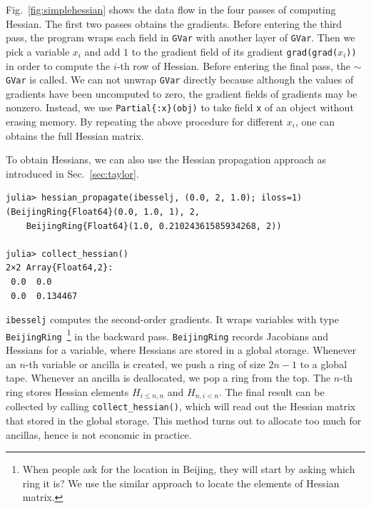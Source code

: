 \documentclass[aps,twocolumn,longbibliography,english,superscriptaddress]{revtex4-1}
\newcommand{\<}{\langle}
\renewcommand{\>}{\rangle}
\newcommand{\Fig}[1]{Fig.~\ref{#1}}
\newcommand{\Sec}[1]{Sec.~\ref{#1}}
\theoremstyle{definition}\newtheorem{definition}{\textit{Definition}}
\begin{document}
\Fig{fig:simplehessian} shows the data flow in the four passes of computing Hessian. The first two passes obtains the gradients. Before entering the third pass, the program wraps each field in \texttt{GVar} with another layer of \texttt{GVar}. Then we pick a variable $x_i$ and add $1$ to the gradient field of its gradient \texttt{grad(grad($x_i$))} in order to compute the $i$-th row of Hessian. Before entering the final pass, the \texttt{$\sim$GVar} is called. We can not unwrap \texttt{GVar} directly because although the values of gradients have been uncomputed to zero, the gradient fields of gradients may be nonzero. Instead, we use \texttt{Partial\{:x\}(obj)} to take field \texttt{x} of an object without erasing memory. By repeating the above procedure for different $x_i$, one can obtains the full Hessian matrix.

To obtain Hessians, we can also use the Hessian propagation approach as introduced in \Sec{sec:taylor}.

\begin{minipage}{.44\textwidth}
\begin{lstlisting}
julia> hessian_propagate(ibesselj, (0.0, 2, 1.0); iloss=1)
(BeijingRing{Float64}(0.0, 1.0, 1), 2,
    BeijingRing{Float64}(1.0, 0.21024361585934268, 2))

julia> collect_hessian()
2×2 Array{Float64,2}:
 0.0  0.0     
 0.0  0.134467
\end{lstlisting}
\end{minipage}

\texttt{ibesselj\textquotesingle\textquotesingle} computes the second-order gradients. It wraps variables with type \texttt{BeijingRing}~\footnote{When people ask for the location in Beijing, they will start by asking which ring it is? We use the similar approach to locate the elements of Hessian matrix.} in the backward pass. \texttt{BeijingRing} records Jacobians and Hessians for a variable, where Hessians are stored in a global storage.
Whenever an $n$-th variable or ancilla is created, we push a ring of size $2n-1$ to a global tape. Whenever an ancilla is deallocated, we pop a ring from the top. The $n$-th ring stores Hessian elements $H_{i\leq n,n}$ and $H_{n,i<n}$.%
The final result can be collected by calling \texttt{collect\_hessian()}, which will read out the Hessian matrix that stored in the global storage.
This method turns out to allocate too much for ancillas, hence is not economic in practice.
\end{document}

